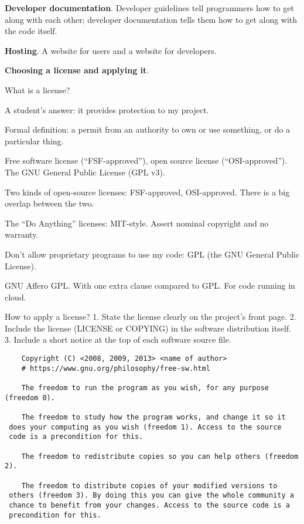 \documentclass[landscape,30pt]{foils}
\begin{document}
{\bf Developer documentation}.  Developer guidelines tell programmers how to get along with each
other; developer documentation tells them how to get along with the code itself. 

{\bf Hosting}. A website for users and a website for developers.

{\bf Choosing a license and applying it}.

What is a license?

A student's answer: it provides protection to my project.

Formal definition:  a permit from an authority to own or use something, or do a particular thing.


Free software license (``FSF-approved''), open source license
(``OSI-approved'').  The GNU General Public License (GPL v3).

Two kinds of open-source licenses:  FSF-approved, OSI-approved.  There is a big overlap between the two.

The ``Do Anything'' licenses: MIT-style.  Assert nominal copyright and no warranty.

Don't allow proprietary programs to use my code: GPL (the GNU General Public License).

GNU Affero GPL.  With one extra clause compared to GPL.  For code running in cloud.

How to apply a license?  1. State the license clearly on the project's
front page.  2. Include the license (LICENSE or COPYING) in the
software distribution itself.  3.  Include a short notice at the top
of each software source file.


{\tiny
\begin{verbatim}
    Copyright (C) <2008, 2009, 2013> <name of author>
    # https://www.gnu.org/philosophy/free-sw.html

    The freedom to run the program as you wish, for any purpose (freedom 0).

    The freedom to study how the program works, and change it so it
 does your computing as you wish (freedom 1). Access to the source
 code is a precondition for this.

    The freedom to redistribute copies so you can help others (freedom 2).
    
    The freedom to distribute copies of your modified versions to
 others (freedom 3). By doing this you can give the whole community a
 chance to benefit from your changes. Access to the source code is a
 precondition for this.

\end{verbatim}
}
\end{document}

